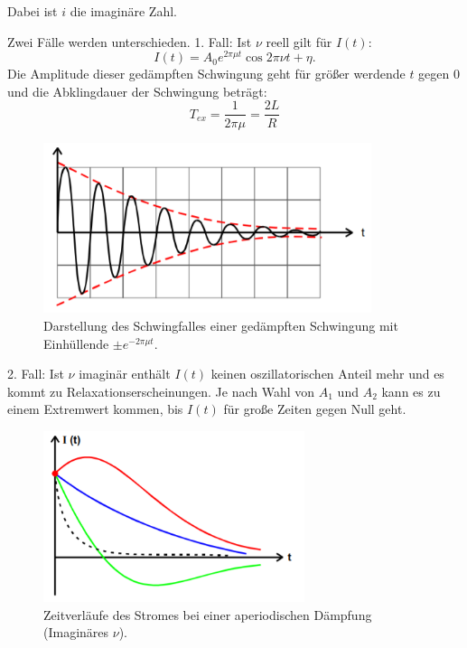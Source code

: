 Dabei ist $i$ die imaginäre Zahl.

Zwei Fälle werden unterschieden.
1. Fall: Ist $\nu$ reell gilt für $I(t)$:
\begin{equation}
  I(t) = A_0 e^{2\pi \mu t} \cos{2\pi \nu t + \eta}.
\end{equation}
Die Amplitude dieser gedämpften Schwingung geht für größer werdende $t$ gegen $0$ und die
Abklingdauer der Schwingung beträgt:
\begin{equation}
  T_{ex} =\frac{1}{2\pi \mu} = \frac{2L}{R}
\end{equation}

\begin{figure}[H]
  \centering
  \includegraphics[height=5cm]{schwingfall.PNG}
  \caption{Darstellung des Schwingfalles einer gedämpften Schwingung mit Einhüllende $\pm e^{-2\pi \mu t}$. \cite{sample}}
  \label{fig:schwingfall}
\end{figure}

2. Fall: Ist $\nu$ imaginär enthält $I(t)$ keinen oszillatorischen Anteil mehr und es kommt
zu Relaxationserscheinungen. Je nach Wahl von $A_1$ und $A_2$ kann es zu einem Extremwert kommen, bis
$I(t)$ für große Zeiten gegen Null geht.

\begin{figure}[H]
  \centering
  \includegraphics[height=5cm]{grenzfall.PNG}
  \caption{Zeitverläufe des Stromes bei einer aperiodischen Dämpfung (Imaginäres $\nu$). \cite{sample}}
  \label{fig:grenzfall}
\end{figure}

